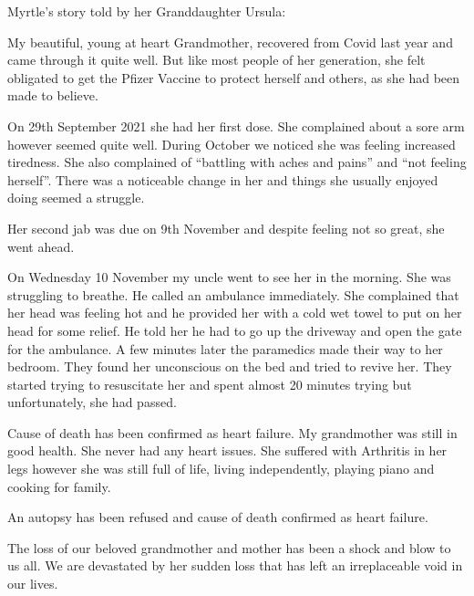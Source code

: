 Myrtle’s story told by her Granddaughter Ursula:

My beautiful, young at heart Grandmother, recovered from Covid last year and
came through it quite well. But like most people of her generation, she felt
obligated to get the Pfizer Vaccine to protect herself and others, as she had
been made to believe.

On 29th September 2021 she had her first dose. She complained about a sore arm
however seemed quite well. During October we noticed she was feeling increased
tiredness. She also complained of “battling with aches and pains” and “not
feeling herself”. There was a noticeable change in her and things she usually
enjoyed doing seemed a struggle.

Her second jab was due on 9th November and despite feeling not so great, she
went ahead.

On Wednesday 10 November my uncle went to see her in the morning. She was
struggling to breathe. He called an ambulance immediately. She complained that
her head was feeling hot and he provided her with a cold wet towel to put on her
head for some relief. He told her he had to go up the driveway and open the gate
for the ambulance. A few minutes later the paramedics made their way to her
bedroom. They found her unconscious on the bed and tried to revive her. They
started trying to resuscitate her and spent almost 20 minutes trying but
unfortunately, she had passed.

Cause of death has been confirmed as heart failure. My grandmother was still in
good health. She never had any heart issues. She suffered with Arthritis in her
legs however she was still full of life, living independently, playing piano and
cooking for family.

An autopsy has been refused and cause of death confirmed as heart failure.

The loss of our beloved grandmother and mother has been a shock and blow to us
all. We are devastated by her sudden loss that has left an irreplaceable void in
our lives.
